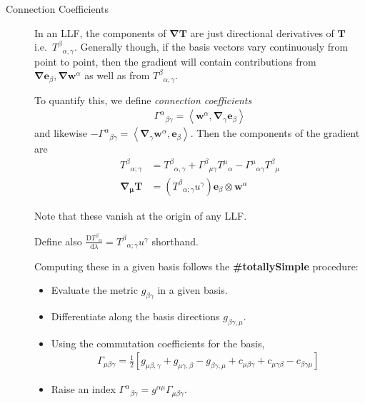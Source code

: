 \documentclass[12pt]{report}
\newcommand{\bm}[1]{\boldsymbol{\mathbf{#1}}}
\newcommand{\expvalue}[1]{\left<#1\right>}
\begin{document}
\begin{description}
    \item[Connection Coefficients] In an LLF, the components of
        $\bm{\nabla}\bm{T}$ are just directional derivatives of $\bm{T}$ i.e.\
        ${T^\beta}_{\alpha,\gamma}$. Generally though, if the basis vectors vary
        continuously from point to point, then the gradient will contain
        contributions from $\bm{\nabla}\bm{e}_\beta, \bm{\nabla}\bm{w}^\alpha$
        as well as from ${T^\beta}_{\alpha,\gamma}$.

        To quantify this, we define \emph{connection coefficients}
        \begin{align}
            {\Gamma^{\alpha}}_{\beta\gamma} = \expvalue{\bm{w}^\alpha,
            \bm{\nabla}_{\gamma}\bm{e}_\beta}
        \end{align}
        and likewise
        $-{\Gamma^{\alpha}}_{\beta\gamma} = \expvalue{\bm{\nabla}_{\gamma}
        \bm{w}^\alpha, \bm{e}_\beta}$. Then the components of the gradient are
        \begin{align}
            {T^{\beta}}_{\alpha;\gamma} &=
                {T^\beta}_{\alpha,\gamma} +
                {\Gamma^\beta}_{\mu\gamma}{T^{\mu}}_\alpha -
                {\Gamma^\mu}_{\alpha\gamma}{T^{\beta}}_\mu\\
            \bm{\nabla}_{\bm{\mu}}\bm{T} &=
                \left( {T^\beta}_{\alpha;\gamma}u^\gamma \right)
                \bm{e}_\beta \otimes \bm{w}^\alpha
        \end{align}

        Note that these vanish at the origin of any LLF\@.

        Define also $\frac{\mathrm{D}{T^\beta}_\alpha}{\mathrm{d}\lambda} =
        {T^\beta}_{\alpha;\gamma}u^\gamma$ shorthand.

        Computing these in a given basis follows the \textbf{\#totallySimple}
        procedure:
        \begin{itemize}
            \item Evaluate the metric $g_{\beta\gamma}$ in a given basis.
            \item Differentiate along the basis directions
                $g_{\beta\gamma,\mu}$.
            \item Using the commutation coefficients for the basis,
                \begin{align}
                    \Gamma_{\mu\beta\gamma} = \frac{1}{2}\left[
                        g_{\mu\beta,\gamma} + g_{\mu\gamma, \beta} -
                        g_{\beta\gamma, \mu} +
                        c_{\mu\beta\gamma} + c_{\mu\gamma\beta} -
                        c_{\beta\gamma\mu}
                    \right]
                \end{align}
            \item Raise an index ${\Gamma^\alpha}_{\beta\gamma} = g^{\alpha\mu}
                \Gamma_{\mu\beta\gamma}$.
        \end{itemize}


\end{description}
\end{document}
